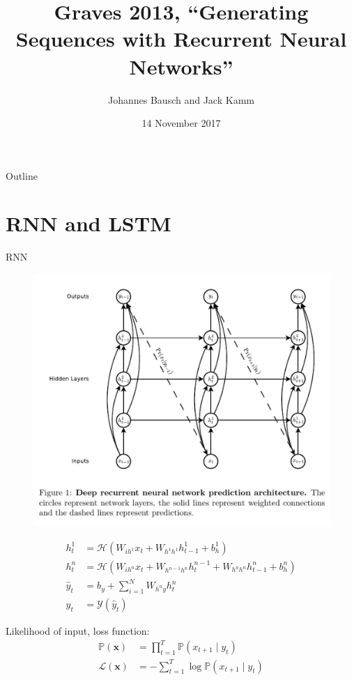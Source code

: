 \documentclass[xcolor=dvipsnames]{beamer}
\title{Graves 2013, ``Generating Sequences with Recurrent Neural Networks''}
\author{Johannes Bausch and Jack Kamm}
\date{14 November 2017}
\def\bfx{\mathbf{x}}
\def\bbP{\mathbb{P}}
\def\cH{\mathcal{H}}
\def\cY{\mathcal{Y}}
\def\cL{\mathcal{L}}
\begin{document}
\frame[plain]{\titlepage}

\begin{frame}[plain]{Outline}
	\tableofcontents
\end{frame}

\section{RNN and LSTM}


\begin{frame}{RNN}
  \begin{figure}
    \centering
    \includegraphics[width=.75\textwidth]{fig/figure1.png}
  \end{figure}
\end{frame}

\begin{frame}
  \begin{align*}
    \label{eq:eqs1-4}
    h_t^1 &= \cH(W_{ih^1} x_t + W_{h^1h^1} h_{t-1}^1 + b_h^1)  \\
    h_t^n &= \cH(W_{ih^n} x_t + W_{h^{n-1}h^{n}} h_{t}^{n-1} + W_{h^{n}h^{n}} h_{t-1}^n + b_h^n) \\
    \hat{y}_t &= b_y + \sum_{i=1}^N W_{h^n y}h_t^n \\
    y_t &= \cY(\hat{y}_t)
  \end{align*}

  Likelihood of input, loss function:
  \begin{align*}
    \bbP(\bfx) &= \prod_{t=1}^T \bbP(x_{t+1} \mid y_t) \\
    \cL(\bfx) &= -\sum_{t=1}^T \log \bbP(x_{t+1} \mid y_t)
  \end{align*}
\end{frame}
\end{document}
